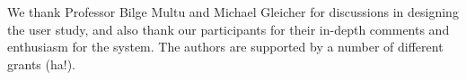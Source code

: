 \documentclass{sigchi}
\begin{document}
We thank Professor Bilge Multu and Michael Gleicher for discussions in designing the user study, and also thank our participants for their in-depth comments and enthusiasm for the system.  The authors are supported by a number of different grants (ha!).

%
%
%
%
%
\balance



\end{document}

